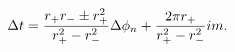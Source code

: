\begin{equation}
\Delta t = { r_+ r_- \pm r_+^2 \over r_+^2 - r_-^2} \Delta \phi_n +
{2\pi r_+ \over r_+^2 - r_-^2} i m.
\end{equation}

